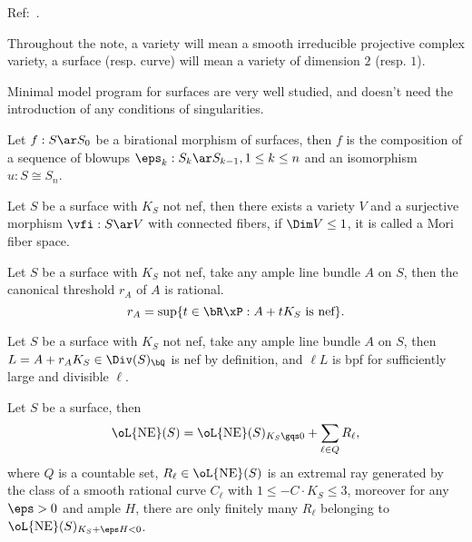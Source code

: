 \documentclass[article, a4paper, twoside]{universal}
\begin{document}
\confighead{}{}{}



Ref:~\cite{Ciliberto2020}.

\begin{stp}
	Throughout the note, a variety will mean a smooth irreducible projective complex variety, a surface (resp. curve) will mean a variety of dimension $2$ (resp. $1$).
\end{stp}

Minimal model program for surfaces are very well studied, and doesn't need the introduction of any conditions of singularities.

\begin{thm}
	Let $f:S\ar S_{0}$ be a birational morphism of surfaces, then $f$ is the composition of a sequence of blowups $\eps_{k}:S_{k}\ar S_{k-1},1\leq k\leq n$ and an isomorphism $u:S\cong S_{n}$.
\end{thm}

\begin{thm}
	Let $S$ be a surface with $K_{S}$ not nef, then there exists a variety $V$ and a surjective morphism $\vfi:S\ar V$ with connected fibers, if $\Dim V\leq1$, it is called a Mori fiber space.
\end{thm}

\begin{thm}
	Let $S$ be a surface with $K_{S}$ not nef, take any ample line bundle $A$ on $S$, then the canonical threshold $r_{A}$ of $A$ is rational.
	\[
		r_{A}=\sup\{t\in\bR\xP: \text{$A+tK_{S}$ is nef}\}.
	\]
\end{thm}

\begin{thm}
	Let $S$ be a surface with $K_{S}$ not nef, take any ample line bundle $A$ on $S$, then $L=A+r_{A}K_{S}\in\Div(S)_{\bQ}$ is nef by definition, and $\ell L$ is bpf for sufficiently large and divisible $\ell$.
\end{thm}

\begin{thm}
	Let $S$ be a surface, then
	\[
		\oL{\mathrm{NE}}(S)=\oL{\mathrm{NE}}(S)_{K_{S}\gqs0}+\sum_{\ell\in Q}R_{\ell},
	\]
	where $Q$ is a countable set, $R_{\ell}\in\oL{\mathrm{NE}}(S)$ is an extremal ray generated by the class of a smooth rational curve $C_{\ell}$ with $1\leq-C\cdot K_{S}\leq3$, moreover for any $\eps>0$ and ample $H$, there are only finitely many $R_{\ell}$ belonging to $\oL{\mathrm{NE}}(S)_{K_{S}+\eps H<0}$.
\end{thm}
\end{document}

